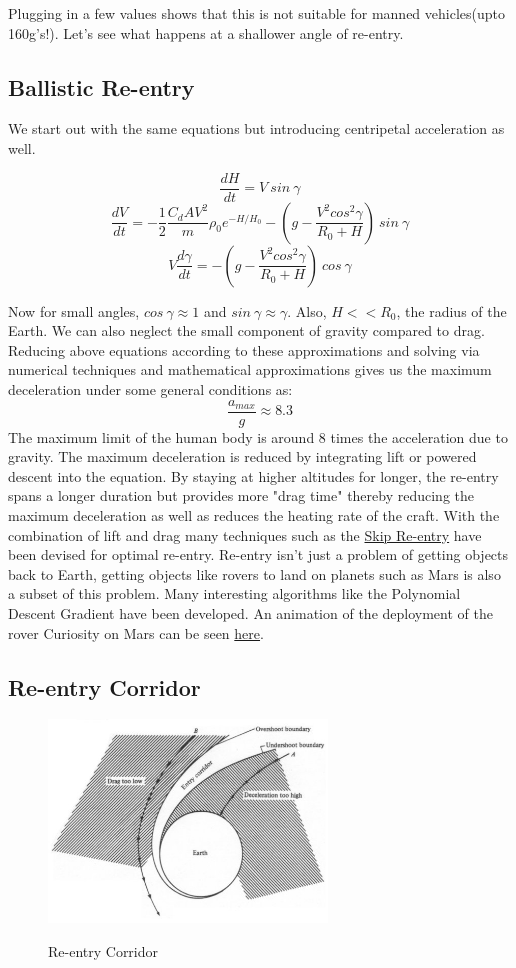 \documentclass[12pt, letterpaper]{article}
\begin{document}
Plugging in a few values shows that this is not suitable for manned vehicles(upto 160g's!). Let's see what happens at a shallower angle of re-entry.

\subsection{Ballistic Re-entry}
We start out with the same equations but introducing centripetal acceleration as well.

\[
	\frac{dH}{dt} = V \:sin\:\gamma
\]
\[
	\frac{dV}{dt} = - \frac{1}{2} \frac{C_d A V^2}{m} \rho_0 e ^ {-H/H_0} - \left( g -\frac{V^2cos^2\gamma}{R_0 + H} \right) \:sin\:\gamma
\]
\[
	V\frac{d\gamma}{dt} = -\left( g -\frac{V^2cos^2\gamma}{R_0 + H} \right)\:cos\:\gamma
\]

Now for small angles, $cos\:\gamma \approx 1$ and $sin\:\gamma \approx \gamma$. Also, $H<<R_0$, the radius of the Earth. We can also neglect the small component of gravity compared to drag. Reducing above equations according to these approximations and solving via numerical techniques and mathematical approximations gives us the maximum deceleration under some general conditions as:
\[
	\frac{a_{max}}{g} \approx 8.3
\]
The maximum limit of the human body is around 8 times the acceleration due to gravity. The maximum deceleration is reduced by integrating lift or powered descent into the equation. By staying at higher altitudes for longer, the re-entry spans a longer duration but provides more "drag time" thereby reducing the maximum deceleration as well as reduces the heating rate of the craft. With the combination of lift and drag many techniques such as the \href{https://en.wikipedia.org/wiki/Boost-glide}{Skip Re-entry} have been devised for optimal re-entry. Re-entry isn't just a problem of getting objects back to Earth, getting objects like rovers to land on planets such as Mars is also a subset of this problem. Many interesting algorithms like the Polynomial Descent Gradient have been developed. An animation of the deployment of the rover Curiosity on Mars can be seen \href{https://www.youtube.com/watch?v=gwinFP8_qIM}{here}.

\subsection{Re-entry Corridor}
\begin{figure}[ht]
	\centering
    \includegraphics[width = 280px]{corridor}
    \label{fig:corridor}
    \caption{Re-entry Corridor}
\end{figure}
\end{document}
